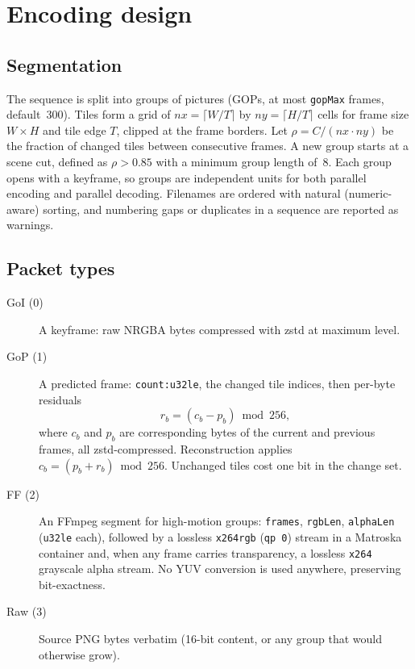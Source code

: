 \documentclass[11pt,a4paper]{article}
\begin{document}
\section{Encoding design}
\label{sec:design}

\subsection{Segmentation}

The sequence is split into groups of pictures (GOPs, at most \texttt{gopMax}
frames, default~300). Tiles form a grid of $nx = \lceil W/T \rceil$ by
$ny = \lceil H/T \rceil$ cells for frame size $W \times H$ and tile edge $T$,
clipped at the frame borders. Let $\rho = C/(nx\cdot ny)$ be the fraction of
changed tiles between consecutive frames. A new group starts at a scene cut,
defined as $\rho > 0.85$ with a minimum group length of~8. Each group opens with a
keyframe, so groups are independent units for both parallel encoding and
parallel decoding. Filenames are ordered with natural (numeric-aware) sorting,
and numbering gaps or duplicates in a sequence are reported as warnings.

\subsection{Packet types}

\begin{description}
\item[GoI (0)] A keyframe: raw NRGBA bytes compressed with zstd at maximum
level.
\item[GoP (1)] A predicted frame: \texttt{count:u32le}, the changed tile
indices, then per-byte residuals
\begin{equation}
r_b = (c_b - p_b) \bmod 256,
\label{eq:residual}
\end{equation}
where $c_b$ and $p_b$ are corresponding bytes of the current and previous
frames, all zstd-compressed. Reconstruction applies
$c_b = (p_b + r_b) \bmod 256$. Unchanged tiles cost one bit in the change set.
\item[FF (2)] An FFmpeg segment for high-motion groups: \texttt{frames},
\texttt{rgbLen}, \texttt{alphaLen} (\texttt{u32le} each), followed by a
lossless \texttt{x264rgb} (\texttt{qp~0}) stream in a Matroska~\cite{matroska}
container and, when any frame carries
transparency, a lossless \texttt{x264} grayscale alpha stream. No YUV
conversion is used anywhere, preserving bit-exactness.
\item[Raw (3)] Source PNG bytes verbatim (16-bit content, or any group that
would otherwise grow).
\end{description}
\end{document}

